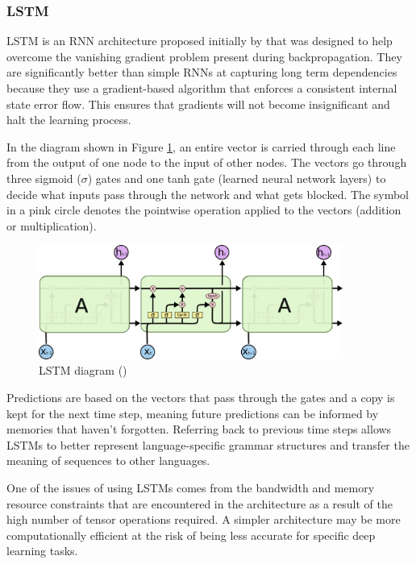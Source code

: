 \subsubsection{\acrlong{LSTM}}

\acrfull{LSTM} is an \acrshort{RNN} architecture proposed initially by \cite{hochreiter_long_1997} that was designed to help overcome the vanishing gradient problem present during backpropagation. They are significantly better than simple \acrshort{RNN}s at capturing long term dependencies because they use a gradient-based algorithm that enforces a consistent internal state error flow. This ensures that gradients will not become insignificant and halt the learning process.

In the diagram shown in Figure \ref{fig:rnn_lstm}, an entire vector is carried through each line from the output of one node to the input of other nodes. The vectors go through three sigmoid ($\sigma$) gates and one tanh gate (learned neural network layers) to decide what inputs pass through the network and what gets blocked. The symbol in a pink circle denotes the pointwise operation applied to the vectors (addition or multiplication).

\begin{figure}[ht!]
\centering
\includegraphics[width=0.89\textwidth]{media/literature/machine_learning/ml_rnn_lstm.png}
\caption[Diagram of Long Short Term Memory]{\acrfull{LSTM} diagram (\cite{colah_lstm_2019})}
\label{fig:rnn_lstm}
\end{figure}

Predictions are based on the vectors that pass through the gates and a copy is kept for the next time step, meaning future predictions can be informed by memories that haven't forgotten. Referring back to previous time steps allows \acrshort{LSTM}s to better represent language-specific grammar structures and transfer the meaning of sequences to other languages.


One of the issues of using \acrshort{LSTM}s comes from the bandwidth and memory resource constraints that are encountered in the architecture as a result of the high number of tensor operations required. A simpler architecture may be more computationally efficient at the risk of being less accurate for specific deep learning tasks.


